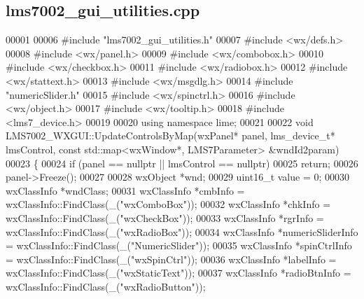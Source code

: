 \subsection{lms7002\+\_\+gui\+\_\+utilities.\+cpp}
\label{lms7002__gui__utilities_8cpp_source}

\begin{DoxyCode}
00001 
00006 \textcolor{preprocessor}{#include "lms7002_gui_utilities.h"}
00007 \textcolor{preprocessor}{#include <wx/defs.h>}
00008 \textcolor{preprocessor}{#include <wx/panel.h>}
00009 \textcolor{preprocessor}{#include <wx/combobox.h>}
00010 \textcolor{preprocessor}{#include <wx/checkbox.h>}
00011 \textcolor{preprocessor}{#include <wx/radiobox.h>}
00012 \textcolor{preprocessor}{#include <wx/stattext.h>}
00013 \textcolor{preprocessor}{#include <wx/msgdlg.h>}
00014 \textcolor{preprocessor}{#include "numericSlider.h"}
00015 \textcolor{preprocessor}{#include <wx/spinctrl.h>}
00016 \textcolor{preprocessor}{#include <wx/object.h>}
00017 \textcolor{preprocessor}{#include <wx/tooltip.h>}
00018 \textcolor{preprocessor}{#include <lms7_device.h>}
00019 
00020 \textcolor{keyword}{using namespace }lime;
00021 
00022 \textcolor{keywordtype}{void} LMS7002_WXGUI::UpdateControlsByMap(wxPanel* panel, lms_device_t* lmsControl, \textcolor{keyword}{const} std::map<wxWindow*,
       LMS7Parameter> &wndId2param)
00023 \{
00024     \textcolor{keywordflow}{if} (panel == \textcolor{keyword}{nullptr} || lmsControl == \textcolor{keyword}{nullptr})
00025         \textcolor{keywordflow}{return};
00026     panel->Freeze();
00027 
00028     wxObject *wnd;
00029     uint16\_t value = 0;
00030     wxClassInfo *wndClass;
00031     wxClassInfo *cmbInfo = wxClassInfo::FindClass(\_(\textcolor{stringliteral}{"wxComboBox"}));
00032     wxClassInfo *chkInfo = wxClassInfo::FindClass(\_(\textcolor{stringliteral}{"wxCheckBox"}));
00033     wxClassInfo *rgrInfo = wxClassInfo::FindClass(\_(\textcolor{stringliteral}{"wxRadioBox"}));
00034     wxClassInfo *numericSliderInfo = wxClassInfo::FindClass(\_(\textcolor{stringliteral}{"NumericSlider"}));
00035     wxClassInfo *spinCtrlInfo = wxClassInfo::FindClass(\_(\textcolor{stringliteral}{"wxSpinCtrl"}));
00036     wxClassInfo *labelInfo = wxClassInfo::FindClass(\_(\textcolor{stringliteral}{"wxStaticText"}));
00037     wxClassInfo *radioBtnInfo = wxClassInfo::FindClass(\_(\textcolor{stringliteral}{"wxRadioButton"}));

\end{DoxyCode}
